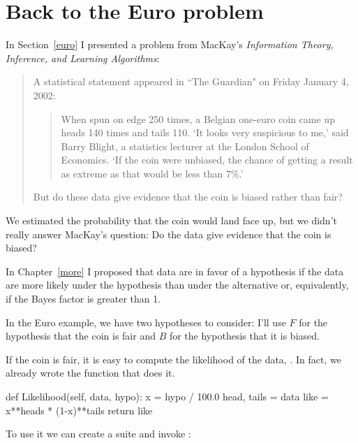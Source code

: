 \documentclass[12pt]{book}
\theoremstyle{exercise}
\begin{document}
\section{Back to the Euro problem}

In Section~\ref{euro} I presented a problem from MacKay's {\it Information
  Theory, Inference, and Learning Algorithms}:

\begin{quote}
A statistical statement appeared in ``The Guardian" on Friday January 4, 2002:

  \begin{quote}
        When spun on edge 250 times, a Belgian one-euro coin came
        up heads 140 times and tails 110.  `It looks very suspicious
        to me,' said Barry Blight, a statistics lecturer at the London
        School of Economics.  `If the coin were unbiased, the chance of
        getting a result as extreme as that would be less than 7\%.'
        \end{quote}

But do these data give evidence that the coin is biased rather than fair?
\end{quote}

We estimated the probability that the coin would
land face up, but we didn't really answer MacKay's question:
Do the data give evidence that the coin is biased?

In Chapter~\ref{more} I proposed that data are in favor of
a hypothesis if the data are more likely under the hypothesis than
under the alternative or, equivalently, if the Bayes factor is greater
than 1.

In the Euro example, we have two hypotheses to consider: I'll use
$F$ for the hypothesis that the coin is fair and $B$ for the hypothesis
that it is biased.

If the coin is fair, it is easy to compute the likelihood of the
data, .  In fact, we already wrote the function
that does it.

\begin{code}
    def Likelihood(self, data, hypo):
        x = hypo / 100.0
        head, tails = data
        like = x**heads * (1-x)**tails
        return like
\end{code}

To use it we can
create a  suite and invoke
:
\end{document}

